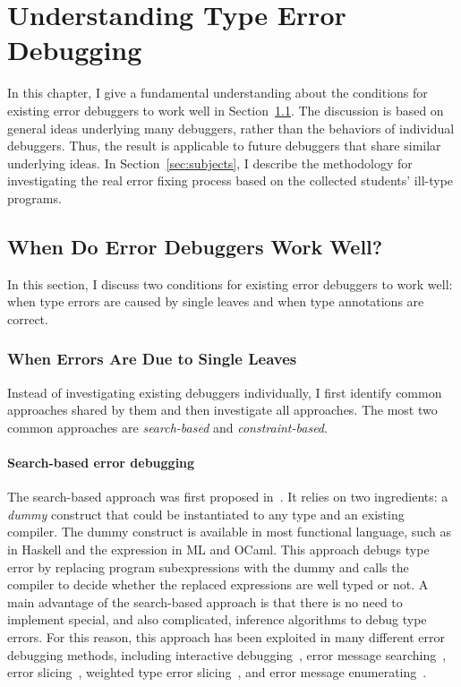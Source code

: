 \documentclass[12pt]{report}	%
\begin{document}
\chapter{Understanding Type Error Debugging}
\label{sec:background}

In this chapter, I give a fundamental understanding about the conditions for existing error debuggers to work well in Section~\ref{sec:backgroud:challenge}.
The discussion is based on general ideas underlying many debuggers, rather than the behaviors of individual debuggers.
Thus, the result is applicable to future debuggers that share similar underlying ideas.
%
In Section~\ref{sec:subjects}, I describe the methodology for investigating the real error fixing process based on the collected students' ill-type programs.

\section{When Do Error Debuggers Work Well?}
\label{sec:backgroud:challenge}

In this section, I discuss two conditions for existing error debuggers to work well:
when type errors are caused by single leaves and when type annotations are correct.

\subsection{When Errors Are Due to Single Leaves}
\label{sec:background:leaves}

Instead of investigating existing debuggers individually,
I first identify common approaches shared by them and then investigate all approaches.
The most two common approaches are
\emph{search-based} and \emph{constraint-based}.

\subsubsection{Search-based error debugging}
\label{sec:background:leaves:search}

The search-based approach was first proposed in~\cite{Bernstein95:DTE}.
%
It relies on two ingredients: a \emph{dummy}
construct that could be instantiated to any type and
an existing compiler. The dummy construct is
available in most functional language, such as
 in Haskell
and the  expression in ML and OCaml.
%
This approach debugs type error by replacing program subexpressions
with the dummy and calls the compiler to decide whether
the replaced expressions are well typed or not.
%
A main advantage of the search-based approach is that there is no
need to implement special, and also complicated, inference
algorithms to debug type errors.
For this reason, this approach has been
exploited in many different error debugging methods,
including interactive
debugging~\cite{Brassel04:TH,Tsushima13:ETD},
error message
searching~\cite{Lerner06:SSM,Lerner07:STM},
error slicing~\cite{Schilling12:CFT},
weighted type error
slicing~\cite{TSUSHIMA14:WTE}, and error message
enumerating~\cite{Tsushima14:ECF}.
\end{document}
